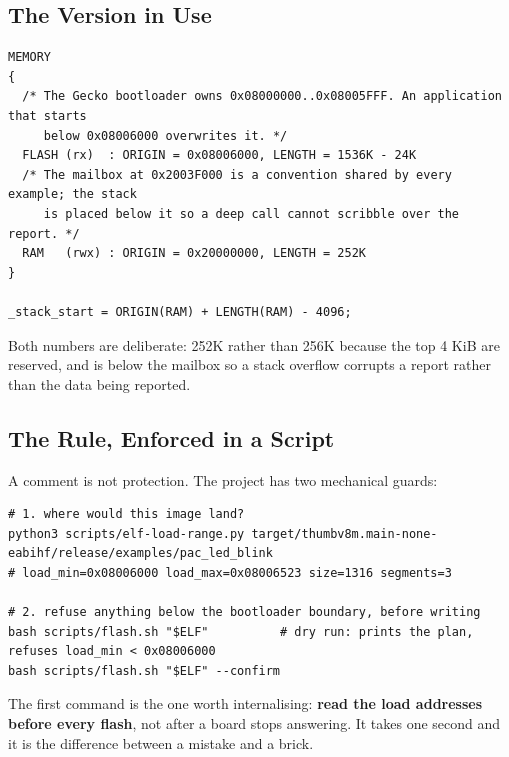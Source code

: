 \subsection{The Version in Use}

\begin{verbatim}
MEMORY
{
  /* The Gecko bootloader owns 0x08000000..0x08005FFF. An application that starts
     below 0x08006000 overwrites it. */
  FLASH (rx)  : ORIGIN = 0x08006000, LENGTH = 1536K - 24K
  /* The mailbox at 0x2003F000 is a convention shared by every example; the stack
     is placed below it so a deep call cannot scribble over the report. */
  RAM   (rwx) : ORIGIN = 0x20000000, LENGTH = 252K
}

_stack_start = ORIGIN(RAM) + LENGTH(RAM) - 4096;
\end{verbatim}

Both numbers are deliberate: 252K rather than 256K because the top 4 KiB are reserved, and
 is below the mailbox so a stack overflow corrupts a report rather than the
data being reported.

\subsection{The Rule, Enforced in a Script}

A comment is not protection. The project has two mechanical guards:

\begin{verbatim}
# 1. where would this image land?
python3 scripts/elf-load-range.py target/thumbv8m.main-none-eabihf/release/examples/pac_led_blink
# load_min=0x08006000 load_max=0x08006523 size=1316 segments=3

# 2. refuse anything below the bootloader boundary, before writing
bash scripts/flash.sh "$ELF"          # dry run: prints the plan, refuses load_min < 0x08006000
bash scripts/flash.sh "$ELF" --confirm
\end{verbatim}

The first command is the one worth internalising: \textbf{read the load addresses before every flash},
not after a board stops answering. It takes one second and it is the difference between a mistake and
a brick.
